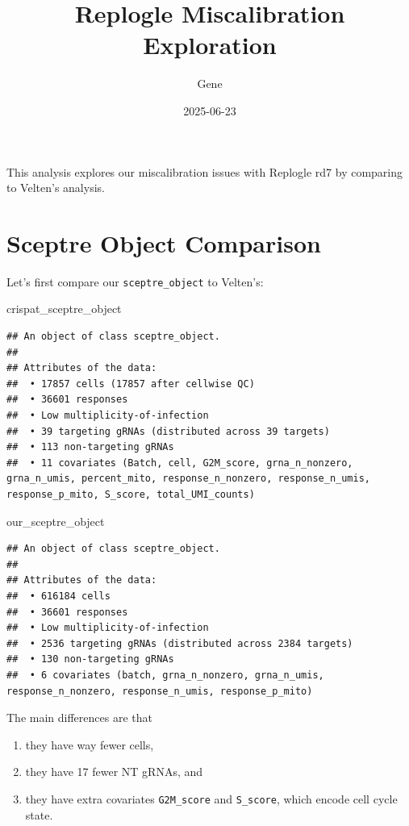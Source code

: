 \documentclass[
]{article}
\title{Replogle Miscalibration Exploration}
\author{Gene}
\date{2025-06-23}
\newenvironment{Shaded}{\begin{snugshade}}{\end{snugshade}}
\newcommand{\NormalTok}[1]{#1}
\providecommand{\tightlist}{%
  \setlength{\itemsep}{0pt}\setlength{\parskip}{0pt}}
\begin{document}
\maketitle

This analysis explores our miscalibration issues with Replogle rd7 by
comparing to Velten's analysis.

\section{Sceptre Object Comparison}\label{sceptre-object-comparison}

Let's first compare our \texttt{sceptre\_object} to Velten's:

\begin{Shaded}
\begin{Highlighting}[]
\NormalTok{crispat\_sceptre\_object}
\end{Highlighting}
\end{Shaded}

\begin{verbatim}
## An object of class sceptre_object.
## 
## Attributes of the data:
##  • 17857 cells (17857 after cellwise QC)
##  • 36601 responses
##  • Low multiplicity-of-infection 
##  • 39 targeting gRNAs (distributed across 39 targets) 
##  • 113 non-targeting gRNAs 
##  • 11 covariates (Batch, cell, G2M_score, grna_n_nonzero, grna_n_umis, percent_mito, response_n_nonzero, response_n_umis, response_p_mito, S_score, total_UMI_counts)
\end{verbatim}

\begin{Shaded}
\begin{Highlighting}[]
\NormalTok{our\_sceptre\_object}
\end{Highlighting}
\end{Shaded}

\begin{verbatim}
## An object of class sceptre_object.
## 
## Attributes of the data:
##  • 616184 cells
##  • 36601 responses
##  • Low multiplicity-of-infection 
##  • 2536 targeting gRNAs (distributed across 2384 targets) 
##  • 130 non-targeting gRNAs 
##  • 6 covariates (batch, grna_n_nonzero, grna_n_umis, response_n_nonzero, response_n_umis, response_p_mito)
\end{verbatim}

The main differences are that

\begin{enumerate}
\def\labelenumi{\arabic{enumi}.}
\tightlist
\item
  they have way fewer cells,
\item
  they have 17 fewer NT gRNAs, and
\item
  they have extra covariates \texttt{G2M\_score} and \texttt{S\_score},
  which encode cell cycle state.
\end{enumerate}
\end{document}
